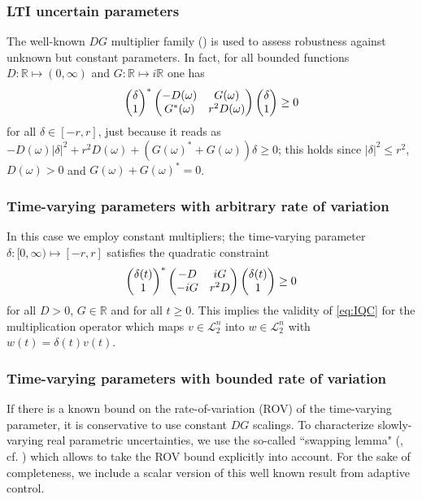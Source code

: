 \subsubsection{LTI uncertain parameters} The well-known $DG$ multiplier family (\cite{meinsmafu,fantits}) 
is used to assess robustness against unknown but constant parameters. In fact, for all bounded functions 
$D:\mathbb{R}\mapsto(0,\infty)$ and $G:\mathbb{R}\mapsto i\mathbb{R}$ one has
\begin{equation*}
\begin{pmatrix}\delta\\1\end{pmatrix}^*\begin{pmatrix}-D(\omega) &G(\omega)\\G^*(\omega) &r^2D(\omega)\end{pmatrix}\begin{pmatrix}\delta\\1\end{pmatrix}\geq 0
\end{equation*}
for all $\delta\in[-r,r]$, just because it reads as
$-D(\omega)|\delta|^2 + r^2 D(\omega) + (G(\omega)^*+G(\omega))\delta\geq 0$;
this holds since $|\delta|^2\leq r^2$, $D(\omega)>0$ and $G(\omega)+G(\omega)^*=0$.


\subsubsection{Time-varying parameters with arbitrary rate of variation}
In this case we employ constant multipliers; the time-varying parameter $\delta:[0,\infty)\mapsto [-r,r]$ 
satisfies the quadratic constraint
\begin{equation*}
\begin{pmatrix}\delta(t)\\1\end{pmatrix}^*\begin{pmatrix}-D &iG\\-iG &r^2D\end{pmatrix}\begin{pmatrix}\delta(t)\\1\end{pmatrix}\geq 0
\end{equation*}
for all $D>0$, $G\in\mathbb{R}$ and for all $t\geq 0$. This implies the validity of \eqref{eq:IQC} 
for the multiplication operator which maps $v\in \mathcal{L}_2^n$ into $w\in\mathcal{L}_2^n$ with 
$w(t)=\delta(t)v(t)$.


\subsubsection{Time-varying parameters with bounded rate of variation} If there is a known bound on 
the rate-of-variation (ROV) of the time-varying parameter, it is conservative to use constant $DG$ 
scalings. To characterize slowly-varying real parametric uncertainties, we use the so-called ``swapping 
lemma" (\cite{helmersson,jonsson,koroglu}, cf. \cite{packardteng}) which allows to take the ROV 
bound explicitly into account. For the sake of completeness, we include a scalar version of this 
well known result from adaptive control.


